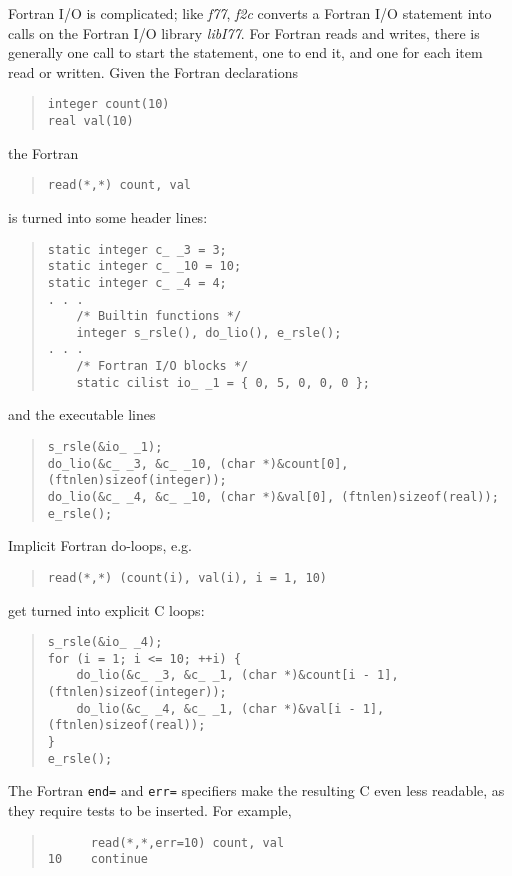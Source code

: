 \documentclass[12pt]{article}
\begin{document}
Fortran I/O is complicated; like \emph{f77}, \emph{f2c} converts a Fortran I/O statement into calls on the Fortran I/O library \emph{libI77}. For Fortran reads and writes, there is generally one call to start the statement, one to end it, and one for each item read or written. Given the Fortran declarations
\begin{quote}
\begin{verbatim}
integer count(10)
real val(10)
\end{verbatim}
\end{quote}
the Fortran
\begin{quote}
\begin{verbatim}
read(*,*) count, val
\end{verbatim}
\end{quote}
is turned into some header lines:
\begin{quote}
\begin{verbatim}
static integer c_ _3 = 3;
static integer c_ _10 = 10;
static integer c_ _4 = 4;
. . .
    /* Builtin functions */
    integer s_rsle(), do_lio(), e_rsle();
. . .
    /* Fortran I/O blocks */
    static cilist io_ _1 = { 0, 5, 0, 0, 0 };
\end{verbatim}
\end{quote}
and the executable lines
\begin{quote}
\begin{verbatim}
s_rsle(&io_ _1);
do_lio(&c_ _3, &c_ _10, (char *)&count[0], (ftnlen)sizeof(integer));
do_lio(&c_ _4, &c_ _10, (char *)&val[0], (ftnlen)sizeof(real));
e_rsle();
\end{verbatim}
\end{quote}
Implicit Fortran do-loops, e.g.
\begin{quote}
\begin{verbatim}
read(*,*) (count(i), val(i), i = 1, 10)
\end{verbatim}
\end{quote}
get turned into explicit C loops:
\begin{quote}
\begin{verbatim}
s_rsle(&io_ _4);
for (i = 1; i <= 10; ++i) {
    do_lio(&c_ _3, &c_ _1, (char *)&count[i - 1], (ftnlen)sizeof(integer));
    do_lio(&c_ _4, &c_ _1, (char *)&val[i - 1], (ftnlen)sizeof(real));
}
e_rsle();
\end{verbatim}
\end{quote}
The Fortran \verb|end=| and \verb|err=| specifiers make the resulting C even less readable, as they require tests to be inserted. For example,
\begin{quote}
\begin{verbatim}
      read(*,*,err=10) count, val
10    continue
\end{verbatim}
\end{quote}
\end{document}
